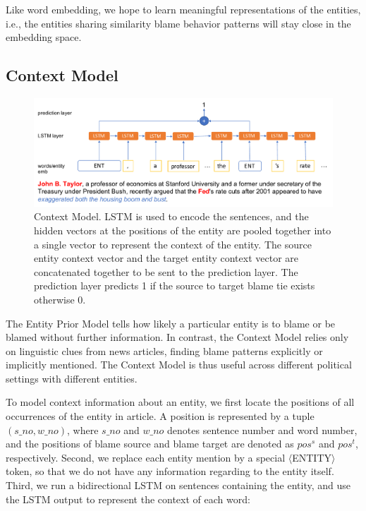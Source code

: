 \documentclass[letterpaper]{article}
\begin{document}
Like word embedding, we hope to learn meaningful representations of the entities, i.e., the entities sharing similarity blame behavior patterns will stay close in the embedding space.

\subsection{Context Model}
\label{contextmodel}

\begin{figure}[!tp] 
  \centering 
  \includegraphics[width=5.5in]{contextmodel.pdf}
  \caption{Context Model. LSTM is used to encode the sentences, and the hidden vectors at the positions of the entity are pooled together into a single vector to represent the context of the entity. The source entity context vector and the target entity context vector are concatenated together to be sent to the prediction layer. The prediction layer predicts 1 if the source to target blame tie exists otherwise 0.}
  \label{figure:contextmodel}
\end{figure}

The Entity Prior Model tells how likely a particular entity is to blame or be blamed without further information. In contrast, the Context Model relies only on linguistic clues from news articles, finding blame patterns explicitly or implicitly mentioned. The Context Model is thus useful across different political settings with different entities.

To model context information about an entity, we first locate the positions of all occurrences of the entity in article. A position is represented by a tuple $(s\_no, w\_no)$, where $s\_no$ and $w\_no$ denotes sentence number and word number, and the positions of blame source and blame target are denoted as $pos^s$ and $pos^t$, respectively. Second, we replace each entity mention by a special $\langle$ENTITY$\rangle$ token, so that we do not have any information regarding to the entity itself. Third, we run a bidirectional LSTM on sentences containing the entity, and use the LSTM output to represent the context of each word:
\end{document}
